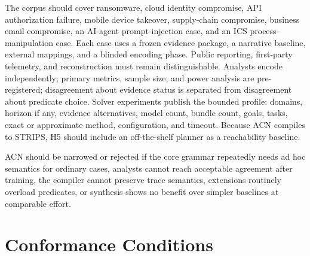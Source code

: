 \documentclass[11pt,letterpaper]{article}
\theoremstyle{definition}
\begin{document}
The corpus should cover ransomware, cloud identity compromise, API authorization failure, mobile device takeover, supply-chain compromise, business email compromise, an AI-agent prompt-injection case, and an ICS process-manipulation case. Each case uses a frozen evidence package, a narrative baseline, external mappings, and a blinded encoding phase. Public reporting, first-party telemetry, and reconstruction must remain distinguishable. Analysts encode independently; primary metrics, sample size, and power analysis are pre-registered; disagreement about evidence status is separated from disagreement about predicate choice. Solver experiments publish the bounded profile: domains, horizon if any, evidence alternatives, model count, bundle count, goals, tasks, exact or approximate method, configuration, and timeout. Because ACN compiles to STRIPS, H5 should include an off-the-shelf planner as a reachability baseline.

ACN should be narrowed or rejected if the core grammar repeatedly needs ad hoc semantics for ordinary cases, analysts cannot reach acceptable agreement after training, the compiler cannot preserve trace semantics, extensions routinely overload predicates, or synthesis shows no benefit over simpler baselines at comparable effort.

\section{Conformance Conditions}\label{sec:conformance}
\end{document}
